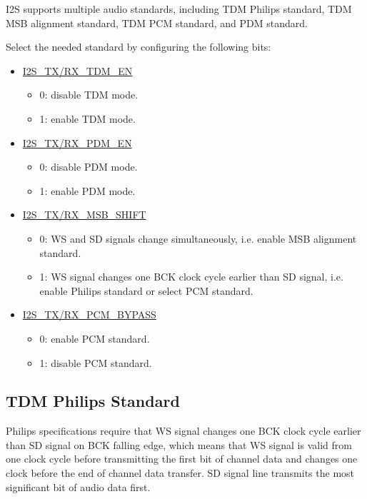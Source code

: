 \documentclass[main\_\_EN.tex]{subfiles}
\begin{document}
\chipname{} I2S supports multiple audio standards, including TDM Philips standard, TDM MSB alignment standard, TDM PCM standard, and PDM standard.

Select the needed standard by configuring the following bits:
\begin{itemize}
    \item \hyperref[fielddesc:I2SRXMSBSHIFT]{I2S\_TX/RX\_TDM\_EN}
    \begin{itemize}
        \item 0: disable TDM mode.
        \item 1: enable TDM mode.
    \end{itemize}
    \item \hyperref[fielddesc:I2SRXMSBSHIFT]{I2S\_TX/RX\_PDM\_EN}
    \begin{itemize}
        \item 0: disable PDM mode.
        \item 1: enable PDM mode.
    \end{itemize}    
    \item \hyperref[fielddesc:I2SRXMSBSHIFT]{I2S\_TX/RX\_MSB\_SHIFT}
    \begin{itemize}
        \item 0: WS and SD signals change simultaneously, i.e. enable MSB alignment standard.  
        \item 1: WS signal changes one BCK clock cycle earlier than SD signal, i.e. enable Philips standard or select PCM standard.
    \end{itemize}
    \item \hyperref[fielddesc:I2SRXPCMBYPASS]{I2S\_TX/RX\_PCM\_BYPASS}
    \begin{itemize}
        \item 0: enable PCM standard.
        \item 1: disable PCM standard.
    \end{itemize}
\end{itemize}

\subsection{TDM Philips Standard}




Philips specifications require that WS signal changes one BCK clock cycle earlier than SD signal on BCK falling edge, which means that WS signal is valid from one clock cycle before transmitting the first bit of channel data and changes one clock before the end of channel data transfer. SD signal line transmits the most significant bit of audio data first. 
\end{document}
